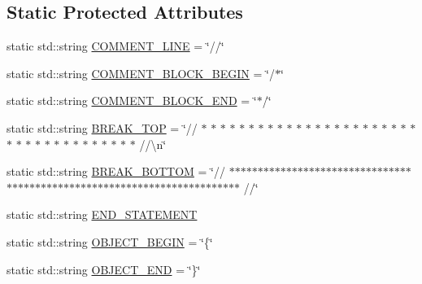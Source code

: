 \subsection*{Static Protected Attributes}
\begin{DoxyCompactItemize}
\item 
static std\-::string \hyperlink{classosea_1_1ofreq_1_1ioword_a7f7a2ec95c21d7130a0ba434cde16a4e}{C\-O\-M\-M\-E\-N\-T\-\_\-\-L\-I\-N\-E} = \char`\"{}//\char`\"{}
\item 
static std\-::string \hyperlink{classosea_1_1ofreq_1_1ioword_a83a6793347a449641666c675cc2e4d8b}{C\-O\-M\-M\-E\-N\-T\-\_\-\-B\-L\-O\-C\-K\-\_\-\-B\-E\-G\-I\-N} = \char`\"{}/$\ast$\char`\"{}
\item 
static std\-::string \hyperlink{classosea_1_1ofreq_1_1ioword_a9b71f789d6b8c56335f22ab5a542089d}{C\-O\-M\-M\-E\-N\-T\-\_\-\-B\-L\-O\-C\-K\-\_\-\-E\-N\-D} = \char`\"{}$\ast$/\char`\"{}
\item 
static std\-::string \hyperlink{classosea_1_1ofreq_1_1ioword_ae34010793caf6a026dcf1e5942e49cb3}{B\-R\-E\-A\-K\-\_\-\-T\-O\-P} = \char`\"{}// $\ast$ $\ast$ $\ast$ $\ast$ $\ast$ $\ast$ $\ast$ $\ast$ $\ast$ $\ast$ $\ast$ $\ast$ $\ast$ $\ast$ $\ast$ $\ast$ $\ast$ $\ast$ $\ast$ $\ast$ $\ast$ $\ast$ $\ast$ $\ast$ $\ast$ $\ast$ $\ast$ $\ast$ $\ast$ $\ast$ $\ast$ $\ast$ $\ast$ $\ast$ $\ast$ $\ast$ $\ast$ //\textbackslash{}n\char`\"{}
\item 
static std\-::string \hyperlink{classosea_1_1ofreq_1_1ioword_acbe9d35566f3a8ef7a8993f3fb14a11d}{B\-R\-E\-A\-K\-\_\-\-B\-O\-T\-T\-O\-M} = \char`\"{}// $\ast$$\ast$$\ast$$\ast$$\ast$$\ast$$\ast$$\ast$$\ast$$\ast$$\ast$$\ast$$\ast$$\ast$$\ast$$\ast$$\ast$$\ast$$\ast$$\ast$$\ast$$\ast$$\ast$$\ast$$\ast$$\ast$$\ast$$\ast$$\ast$$\ast$$\ast$$\ast$$\ast$$\ast$$\ast$$\ast$$\ast$$\ast$$\ast$$\ast$$\ast$$\ast$$\ast$$\ast$$\ast$$\ast$$\ast$$\ast$$\ast$$\ast$$\ast$$\ast$$\ast$$\ast$$\ast$$\ast$$\ast$$\ast$$\ast$$\ast$$\ast$$\ast$$\ast$$\ast$$\ast$$\ast$$\ast$$\ast$$\ast$$\ast$$\ast$$\ast$$\ast$ //\char`\"{}
\item 
static std\-::string \hyperlink{classosea_1_1ofreq_1_1ioword_acc42e2082fae1f23f60065e7c384e723}{E\-N\-D\-\_\-\-S\-T\-A\-T\-E\-M\-E\-N\-T}
\item 
static std\-::string \hyperlink{classosea_1_1ofreq_1_1ioword_af8652cc0e8e1c9aeb67450a23870b64c}{O\-B\-J\-E\-C\-T\-\_\-\-B\-E\-G\-I\-N} = \char`\"{}\{\char`\"{}
\item 
static std\-::string \hyperlink{classosea_1_1ofreq_1_1ioword_a794839618d39b9ba48cd43779b394f44}{O\-B\-J\-E\-C\-T\-\_\-\-E\-N\-D} = \char`\"{}\}\char`\"{}

\end{DoxyCompactItemize}
